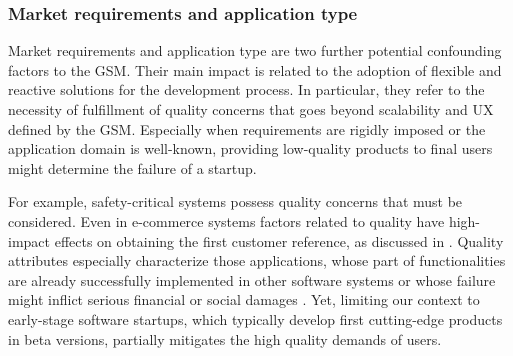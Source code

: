 \documentclass[10pt,journal,letterpaper,compsoc]{IEEEtran}
\begin{document}
\subsubsection{Market requirements and application type} 
Market requirements \cite{Coleman2007} and application type \cite{Sutton2000, 
Coleman2008, Coleman2008a} are two further potential confounding factors to the 
GSM. Their main impact is related to the adoption of flexible and reactive 
solutions for the development process. In particular, they refer to the 
necessity of fulfillment of quality concerns that goes beyond scalability and UX 
defined by the GSM. Especially when requirements are rigidly imposed or the 
application domain is well-known, providing low-quality products to final users 
might determine the failure of a startup. 

For example, safety-critical systems possess quality concerns that must be 
considered. Even in e-commerce systems 
factors related to quality have high-impact effects on obtaining the first customer reference, %
as discussed in \cite{Deakins2005,Kim2005,Silva2005}. Quality attributes especially %
characterize those applications, whose part of functionalities are already 
successfully implemented in other software systems or whose failure might 
inflict serious financial or social damages \cite{Bass2003}. Yet, limiting our 
context to early-stage software startups, which typically develop first 
cutting-edge products in beta versions, partially mitigates the high quality 
demands of users.
\end{document}
